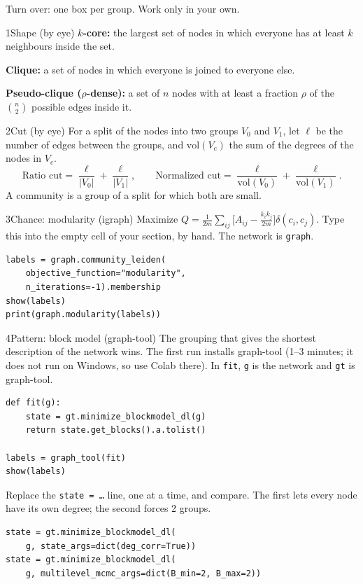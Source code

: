 \documentclass[a4paper, 12pt]{extarticle}
\begin{document}
\vfill
{\color{softgrey}\small Turn over: one box per group. Work only in your own.}

\newpage

\begin{groupbox}{1}{Shape (by eye)}
\textbf{$k$-core:} the largest set of nodes in which everyone has at least $k$ neighbours inside the set.

\textbf{Clique:} a set of nodes in which everyone is joined to everyone else.

\textbf{Pseudo-clique ($\rho$-dense):} a set of $n$ nodes with at least a fraction $\rho$ of the
$\binom{n}{2}$ possible edges inside it.
\end{groupbox}

\vspace{0.3em}
\begin{groupbox}{2}{Cut (by eye)}
For a split of the nodes into two groups $V_0$ and $V_1$, let $\ell$ be the number of edges between
the groups, and $\text{vol}(V_c)$ the sum of the degrees of the nodes in $V_c$.
\[
\text{Ratio cut}=\frac{\ell}{|V_0|}+\frac{\ell}{|V_1|},\qquad
\text{Normalized cut}=\frac{\ell}{\text{vol}(V_0)}+\frac{\ell}{\text{vol}(V_1)}.
\]
A community is a group of a split for which both are small.
\end{groupbox}

\vspace{0.3em}
\begin{groupbox}{3}{Chance: modularity (igraph)}
Maximize $Q=\frac{1}{2m}\sum_{ij}\bigl[A_{ij}-\frac{k_ik_j}{2m}\bigr]\delta(c_i,c_j)$.
Type this into the empty cell of your section, by hand. The network is \texttt{graph}.
\begin{lstlisting}
labels = graph.community_leiden(
    objective_function="modularity",
    n_iterations=-1).membership
show(labels)
print(graph.modularity(labels))
\end{lstlisting}
\end{groupbox}

\vspace{0.3em}
\begin{groupbox}{4}{Pattern: block model (graph-tool)}
The grouping that gives the shortest description of the network wins. The first run installs graph-tool (1--3
minutes; it does not run on Windows, so use Colab there). In \texttt{fit}, \texttt{g} is the
network and \texttt{gt} is graph-tool.
\begin{lstlisting}
def fit(g):
    state = gt.minimize_blockmodel_dl(g)
    return state.get_blocks().a.tolist()

labels = graph_tool(fit)
show(labels)
\end{lstlisting}
Replace the \texttt{state = \ldots} line, one at a time, and compare. The first lets every node have its own degree; the second forces 2 groups.
\begin{lstlisting}
state = gt.minimize_blockmodel_dl(
    g, state_args=dict(deg_corr=True))
state = gt.minimize_blockmodel_dl(
    g, multilevel_mcmc_args=dict(B_min=2, B_max=2))
\end{lstlisting}
\end{groupbox}
\end{document}
